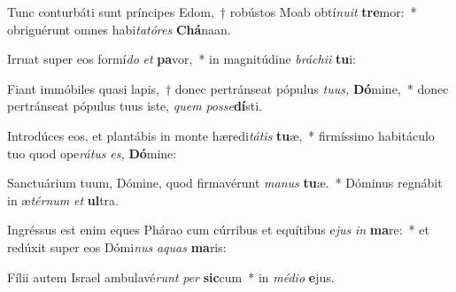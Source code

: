 \item Tunc conturbáti sunt príncipes Edom,~† robústos Moab obtí\tinyhspace\textit{nuit} \textbf{tre}mor:~* obriguérunt omnes habi\textit{tatóres} \textbf{Chá}naan.
\item Irruat super eos formí\textit{do}\hspace*{0.02em} \textit{et} \textbf{pa}vor,~* in magnitúdine \textit{bráchii} \textbf{tu}i:
\item Fiant immóbiles quasi lapis,~† donec pertránseat pópulus \textit{tuus,} \textbf{Dó}mine,~* donec pertránseat pópulus tuus iste, \textit{quem} \textit{posse}\textbf{dí}sti.
\item Introdúces eos, et plantábis in monte hæredi\tinyhspace\textit{tátis} \textbf{tu}æ,~* firmíssimo habitáculo tuo quod ope\textit{rátus} \textit{es,} \textbf{Dó}mine:
\item Sanctuárium tuum, Dómine, quod firmavérunt \textit{manus} \textbf{tu}æ.~* Dóminus regnábit in æ\tinyhspace\textit{térnum} \textit{et} \textbf{ul}tra.
\item Ingréssus est enim eques Phárao cum cúrribus et equítibus e\textit{jus} \textit{in} \textbf{ma}re:~* et redúxit super eos Dómi\tinyhspace\textit{nus} \textit{aquas} \textbf{ma}ris:
\item Fílii autem Israel ambulavé\textit{runt} \textit{per} \textbf{sic}cum~* in \textit{médio} \textbf{e}jus.
